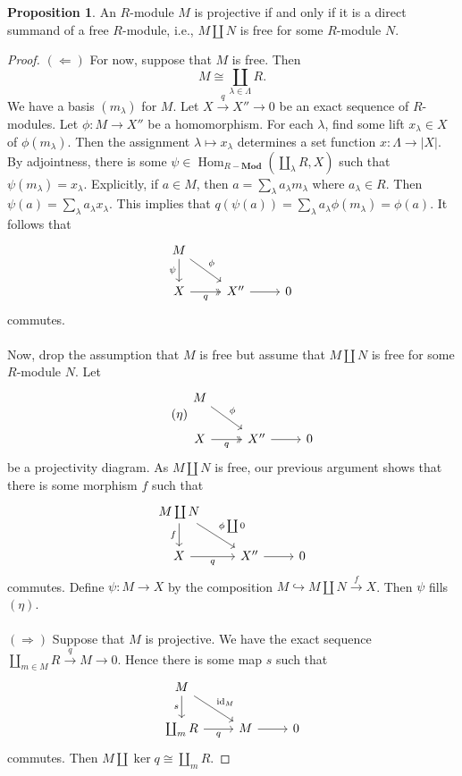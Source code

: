 \documentclass[10pt,letterpaper,cm]{nupset}
\theoremstyle{definition}
\newtheorem{prop}{Proposition}
\newcommand{\1}{\mathbf{1}}
\newcommand{\0}{\vec 0}
\DeclareMathOperator{\id}{id}
\DeclareMathOperator{\Hom}{Hom}
\begin{document}
\begin{prop}
An $R$-module $M$ is projective  if and only if it is a direct summand of a free $R$-module, i.e., $M \coprod N$ is free for some $R$-module $N$.
\end{prop}
\begin{proof}
$(\Longleftarrow)$
For now, suppose that $M$ is free. Then $$M \cong \coprod_{\lambda \in \Lambda} R.$$  We have a basis $(m_{\lambda})$ for $M$. Let $X \overset{q}{\longrightarrow}  X'' \to 0$ be an exact sequence of $R$-modules. Let $\phi : M \to X''$ be a homomorphism. For each $\lambda$, find some lift $x_{\lambda}\in X$ of $\phi(m_{\lambda})$. Then the assignment $\lambda \mapsto x_{\lambda}$ determines a set function $x : \Lambda \to |X|$. By adjointness, there is some $\psi \in \Hom_{R{-}\mathbf{Mod}}(\coprod_{\lambda} R, X)$ such that $\psi(m_{\lambda}) = x_{\lambda}$. Explicitly, if $a \in M$, then $a = \sum_{\lambda}a_{\lambda}m_{\lambda}$ where $a_{\lambda}\in R$. Then $\psi(a) = \sum_{\lambda} a_{\lambda}x_{\lambda}$. This implies that $q(\psi(a)) = \sum_{\lambda} a_{\lambda}\phi(m_{\lambda}) = \phi(a)$. It follows that \[
\begin{tikzcd}
M \arrow[rd, "\phi"] \arrow[d, "\psi"'] &  &  \\
X \arrow[r, "q"', two heads] & X'' \arrow[r] & 0
\end{tikzcd}
\] commutes.
\\ \\ Now, drop the assumption that $M$ is free but assume that $M \coprod N$ is free for some $R$-module $N$. Let 
\[ \tag{$\eta$}
\begin{tikzcd}
M \arrow[rd, "\phi"] &  &  \\
X \arrow[r, "q"', two heads] & X'' \arrow[r] & 0
\end{tikzcd}
\] be a projectivity diagram. As $M \coprod N$ is free, our previous argument shows that there is some morphism $f$ such that
\[\begin{tikzcd}
M\coprod N \arrow[rd, "\phi \coprod 0"] \arrow[d, "f"'] &  &  \\
X \arrow[r, "q"'] & X'' \arrow[r] & 0
\end{tikzcd}
\] commutes. Define $\psi : M \to X$ by the composition $M \hookrightarrow M\coprod N \overset{f}{\longrightarrow} X$. Then $\psi$ fills $(\eta)$.
\\ \\ $(\Longrightarrow)$ Suppose that $M$ is projective. We have the exact sequence $\coprod_{m\in M}R \overset{q}{\longrightarrow}  M \to 0$. Hence there is some map $s$ such that 
\[\begin{tikzcd}
M \arrow[rd, "\id_M"] \arrow[d, "s"'] &  &  \\
\coprod_m R \arrow[r, "q"'] & M \arrow[r] & 0
\end{tikzcd}
\] commutes. Then $M \coprod \ker q \cong \coprod_m R$.
\end{proof}
\end{document}
